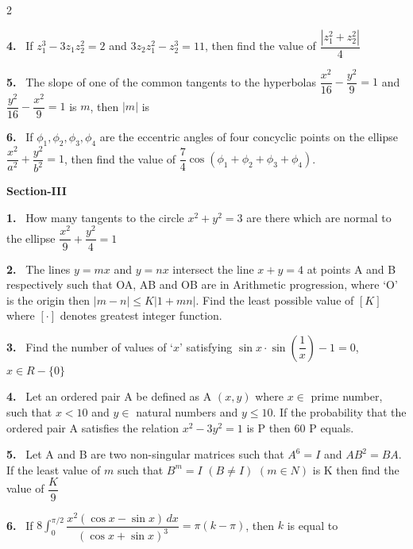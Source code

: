 \documentclass[10pt]{extarticle}
\newcommand{\sect}[1]{\par\smallskip\noindent\textbf{#1}\par}
\newcommand{\qn}[1]{\par\smallskip\noindent\textbf{#1.}~}
\begin{document}
\begin{multicols}{2}
\qn{4} If $z_1^3-3z_1z_2^2=2$ and $3z_2z_1^2-z_2^3=11$, then find the value of $\dfrac{\left|z_1^2+z_2^2\right|}{4}$
\qn{5} The slope of one of the common tangents to the hyperbolas $\dfrac{x^2}{16}-\dfrac{y^2}9=1$ and $\dfrac{y^2}{16}-\dfrac{x^2}9=1$ is $m$, then $|m|$ is
\qn{6} If $\phi_1,\phi_2,\phi_3,\phi_4$ are the eccentric angles of four concyclic points on the ellipse $\dfrac{x^2}{a^2}+\dfrac{y^2}{b^2}=1$, then find the value of $\dfrac74\cos\left(\phi_1+\phi_2+\phi_3+\phi_4\right)$.
\sect{Section-III}
\qn{1} How many tangents to the circle $x^2+y^2=3$ are there which are normal to the ellipse $\dfrac{x^2}{9}+\dfrac{y^2}{4}=1$
\qn{2} The lines $y=mx$ and $y=nx$ intersect the line $x+y=4$ at points A and B respectively such that OA, AB and OB are in Arithmetic progression, where `O' is the origin then $|m-n|\le K|1+mn|$. Find the least possible value of $[K]$ where $[\cdot]$ denotes greatest integer function.
\qn{3} Find the number of values of `$x$' satisfying $\sin x\cdot\sin\left(\dfrac1x\right)-1=0$, $x\in R-\{0\}$
\qn{4} Let an ordered pair A be defined as A $(x,y)$ where $x\in$ prime number, such that $x<10$ and $y\in$ natural numbers and $y\le10$. If the probability that the ordered pair A satisfies the relation $x^2-3y^2=1$ is P then $60$ P equals.
\qn{5} Let A and B are two non-singular matrices such that $A^6=I$ and $AB^2=BA$. If the least value of $m$ such that $B^m=I$ $(B\neq I)$ $(m\in N)$ is K then find the value of $\dfrac K9$
\qn{6} If $8\displaystyle\int_0^{\pi/2}\dfrac{x^2(\cos x-\sin x)\,dx}{(\cos x+\sin x)^3}=\pi(k-\pi)$, then $k$ is equal to
\end{multicols}
\end{document}
